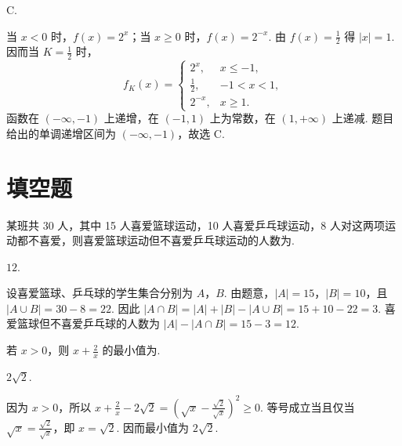 \begin{answer}
C.
\end{answer}

\begin{solution}
当 \(x<0\) 时，\(f(x)=2^x\)；当 \(x\geqslant0\) 时，\(f(x)=2^{-x}\). 由 \(f(x)=\frac12\) 得 \(|x|=1\). 因而当 \(K=\frac12\) 时，
\[
f_K(x)=
\begin{cases}
2^x,&x\leqslant-1,\\
\frac12,&-1<x<1,\\
2^{-x},&x\geqslant1.
\end{cases}
\]
函数在 \((-\infty,-1)\) 上递增，在 \((-1,1)\) 上为常数，在 \((1,+\infty)\) 上递减. 题目给出的单调递增区间为 \((-\infty,-1)\)，故选 C.
\end{solution}

\section{填空题}

\begin{problem}
某班共 30 人，其中 15 人喜爱篮球运动，10 人喜爱乒乓球运动，8 人对这两项运动都不喜爱，则喜爱篮球运动但不喜爱乒乓球运动的人数为\fillinblank{}.
\end{problem}

\begin{answer}
\(12\).
\end{answer}

\begin{solution}
设喜爱篮球、乒乓球的学生集合分别为 \(A\)，\(B\). 由题意，\(|A|=15\)，\(|B|=10\)，且 \(|A\cup B|=30-8=22\). 因此 \(|A\cap B|=|A|+|B|-|A\cup B|=15+10-22=3\). 喜爱篮球但不喜爱乒乓球的人数为 \(|A|-|A\cap B|=15-3=12\).
\end{solution}

\begin{problem}
若 \(x > 0\)，则 \(x + \frac{2}{x}\) 的最小值为\fillinblank{}.
\end{problem}

\begin{answer}
\(2\sqrt{2}\).
\end{answer}

\begin{solution}
因为 \(x>0\)，所以 \(x+\frac{2}{x}-2\sqrt{2}=\left(\sqrt{x}-\frac{\sqrt{2}}{\sqrt{x}}\right)^2\geqslant0\).
等号成立当且仅当 \(\sqrt{x}=\frac{\sqrt{2}}{\sqrt{x}}\)，即 \(x=\sqrt{2}\). 因而最小值为 \(2\sqrt{2}\).
\end{solution}

